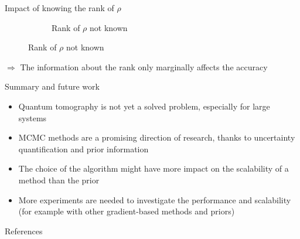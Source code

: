 \documentclass{beamer}
\begin{document}
\begin{frame}{Impact of knowing the rank of $\rho$}
\begin{figure}[H]
\begin{subfigure}[b]{0.49\textwidth}
            \caption{Rank of $\rho$ not known}
    
            \label{fig:rank-no-info-sub}
    
        \end{subfigure}
        
        \label{fig:rank-info}
    
    \end{figure}
    $\Longrightarrow$ The information about the rank only marginally affects the accuracy
\end{frame}

\begin{frame}{Summary and future work}
    \begin{itemize}
        \item Quantum tomography is not yet a solved problem, especially for large  systems
        \item MCMC methods are a promising direction of research, thanks to uncertainty quantification and prior information 
        \item The choice of the algorithm might have more impact on the scalability of a method than the prior
        \item More experiments are needed to investigate the performance and scalability (for example with other gradient-based methods and priors)
    \end{itemize}
\end{frame}
\begin{frame}{References}
    \printbibliography
\end{frame}
\end{document}
